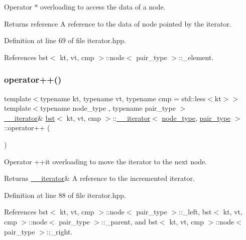 Operator $\ast$ overloading to access the data of a node. 

\begin{DoxyReturn}{Returns}
reference A reference to the data of node pointed by the iterator. 
\end{DoxyReturn}


Definition at line 69 of file iterator.\+hpp.



References bst$<$ kt, vt, cmp $>$\+::node$<$ pair\+\_\+type $>$\+::\+\_\+element.

\mbox{\label{classbst_1_1____iterator_a0551167f26a1769faa27afd7018eeb03}} 
\subsubsection{\texorpdfstring{operator++()}{operator++()}\hspace{0.1cm}{\footnotesize\ttfamily [1/2]}}
{\footnotesize\ttfamily template$<$typename kt, typename vt, typename cmp = std\+::less$<$kt$>$$>$ \\
template$<$typename node\+\_\+type , typename pair\+\_\+type $>$ \\
\hyperlink{classbst_1_1____iterator}{\+\_\+\+\_\+iterator}\& \hyperlink{classbst}{bst}$<$ kt, vt, cmp $>$\+::\hyperlink{classbst_1_1____iterator}{\+\_\+\+\_\+iterator}$<$ \hyperlink{classbst_a062eb2a1ac54802dbc4f0f74ae2afd01}{node\+\_\+type}, \hyperlink{classbst_a7b11cca2a3b4394915600194f741ab16}{pair\+\_\+type} $>$\+::operator++ (\begin{DoxyParamCaption}{ }\end{DoxyParamCaption})\hspace{0.3cm}{\ttfamily [inline]}}



Operator ++it overloading to move the iterator to the next node. 

\begin{DoxyReturn}{Returns}
\hyperlink{classbst_1_1____iterator}{\+\_\+\+\_\+iterator}\& A reference to the incremented iterator. 
\end{DoxyReturn}


Definition at line 88 of file iterator.\+hpp.



References bst$<$ kt, vt, cmp $>$\+::node$<$ pair\+\_\+type $>$\+::\+\_\+left, bst$<$ kt, vt, cmp $>$\+::node$<$ pair\+\_\+type $>$\+::\+\_\+parent, and bst$<$ kt, vt, cmp $>$\+::node$<$ pair\+\_\+type $>$\+::\+\_\+right.

